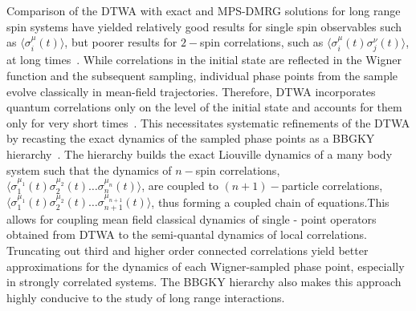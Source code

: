 \documentclass[extendedabs]{bmvc2k}
\begin{document}
Comparison of the DTWA with exact and MPS-DMRG solutions for long range spin systems have yielded relatively good results for single spin observables such as $\langle \sigma^\mu_i(t)\rangle$, but poorer results for $2-$spin correlations, such as $\langle \sigma^\mu_i(t) \sigma^\nu_j(t)\rangle$, at long times~\cite{Schachenmaye15}. While correlations in the initial state are reflected in the Wigner function and the subsequent sampling, individual phase points from the sample evolve classically in mean-field trajectories. Therefore, DTWA incorporates quantum correlations only on the level of the initial state and accounts for them only for very short times~\cite{Pucci16}. This necessitates systematic refinements of the DTWA by recasting the exact dynamics of the sampled phase points as a BBGKY hierarchy~\cite{Pucci16}. The hierarchy builds the exact Liouville dynamics of a many body system such that the dynamics of $n-$spin correlations, $\langle \sigma^{\mu_1}_1(t) \sigma^{\mu_2}_2(t)\dots\sigma^{\mu_n}_n(t)\rangle$, are  coupled to $(n+1)-$particle correlations, $\langle \sigma^{\mu_1}_1(t) \sigma^{\mu_2}_2(t)\dots\sigma^{\mu_{n+1}}_{n+1}(t)\rangle$, thus
forming a coupled chain of equations.This allows for coupling mean field classical dynamics of single - point operators obtained from DTWA to the semi-quantal dynamics of local correlations. Truncating out third  and higher order connected correlations yield better approximations for the dynamics of each Wigner-sampled phase point, especially in strongly correlated systems. The BBGKY hierarchy also makes this approach highly conducive to the study of long range interactions.
\end{document}
